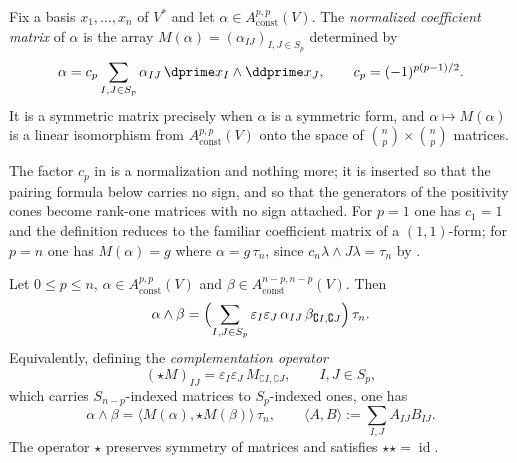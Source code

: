 \begin{definition}
\label{def:ch09-coefficient-matrix}
Fix a basis $x_1,\ldots,x_n$ of $V^*$ and let
$\alpha\in A_{\mathrm{const}}^{p,p}(V)$.  The
\emph{normalized coefficient matrix} of $\alpha$ is the array
$M(\alpha)=(\alpha_{IJ})_{I,J\in S_p}$ determined by
\[
 \alpha=c_p\sum_{I,J\in S_p}\alpha_{IJ}\,\dprime x_I\wedge\ddprime x_J,
 \qquad c_p=(-1)^{p(p-1)/2}.
\]
It is a symmetric matrix precisely when $\alpha$ is a symmetric form, and
$\alpha\mapsto M(\alpha)$ is a linear isomorphism from
$A_{\mathrm{const}}^{p,p}(V)$ onto the
space of $\binom np\times\binom np$ matrices.
\end{definition}

The factor $c_p$ in  is a normalization and
nothing more; it is inserted so that the pairing formula below carries no
sign, and so that the generators of the positivity cones become rank-one
matrices with no sign attached.  For $p=1$ one has $c_1=1$ and the definition
reduces to the familiar coefficient matrix of a $(1,1)$-form; for $p=n$ one
has $M(\alpha)=g$ where $\alpha=g\,\tau_n$, since $c_n\lambda\wedge J\lambda
=\tau_n$ by .

\begin{lemma}
\label{lem:ch09-complement-pairing}
Let $0\leq p\leq n$, $\alpha\in A_{\mathrm{const}}^{p,p}(V)$ and
$\beta\in A_{\mathrm{const}}^{n-p,n-p}(V)$.  Then
\[
 \alpha\wedge\beta
 =\Bigl(\sum_{I,J\in S_p}
    \varepsilon_I\varepsilon_J\,
    \alpha_{IJ}\,\beta_{\complement I,\complement J}\Bigr)\,\tau_n .
\]
Equivalently, defining the \emph{complementation operator}
\[
 (\star M)_{IJ}=\varepsilon_I\varepsilon_J\,M_{\complement I,\complement J},
 \qquad I,J\in S_p,
\]
which carries $S_{n-p}$-indexed matrices to $S_p$-indexed ones, one has
\[
 \alpha\wedge\beta=\bigl\langle M(\alpha),\star M(\beta)\bigr\rangle\,\tau_n,
 \qquad
 \langle A,B\rangle:=\sum_{I,J}A_{IJ}B_{IJ}.
\]
The operator $\star$ preserves symmetry of matrices and satisfies
$\star\star=\operatorname{id}$.
\end{lemma}

